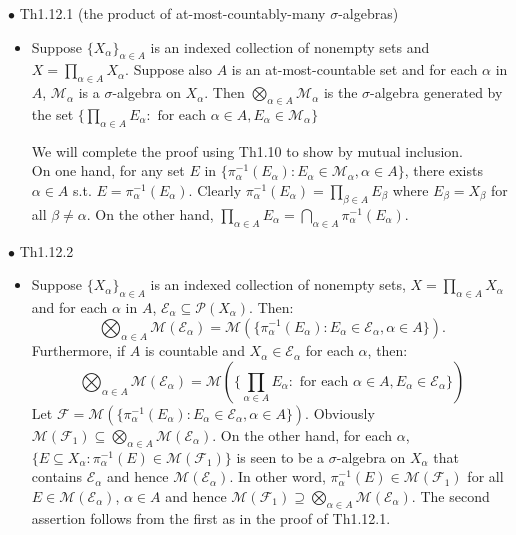 \documentclass{article}
\begin{document}
{\Large $\bullet $ Th1.12.1 (the product of at-most-countably-many $\sigma$-algebras)}\par
\begin{itemize}
    \item[]
    {\large Suppose $\{X_\alpha\}_{\alpha\in A}$ is an indexed collection of nonempty sets 
    and $X=\prod_{\alpha\in A}X_\alpha$. Suppose also $A$ is an at-most-countable set and for each $\alpha$ in $A$, 
    $\mathcal{M}_\alpha$ is a $\sigma$-algebra on $X_\alpha$. 
    Then $\bigotimes_{\alpha\in A}\mathcal{M}_\alpha$ is the $\sigma$-algebra 
    generated by the set 
    $\{\prod_{\alpha\in A}E_\alpha: \text{ for each } \alpha\in A, E_\alpha\in\mathcal{M}_\alpha\}$}\par
    {\textcolor{pf}{We will complete the proof using Th1.10 to show by mutual inclusion.\\
    On one hand, for any set $E$ in $\{\pi_{\alpha}^{-1}(E_\alpha):E_\alpha \in \mathcal{M}_\alpha, \alpha\in A\}$,
    there exists $\alpha\in A$ s.t. $E=\pi_{\alpha}^{-1}(E_\alpha)$. 
    Clearly $\pi_{\alpha}^{-1}(E_\alpha) = \prod_{\beta\in A}E_\beta$ 
    where $E_\beta = X_\beta$ for all $\beta\neq \alpha$. On the other hand, 
    $\prod_{\alpha\in A}E_\alpha = \bigcap_{\alpha\in A}\pi_{\alpha}^{-1}(E_\alpha)$.}}
\end{itemize}\par
\quad

{\Large $\bullet $ Th1.12.2}\par
\begin{itemize}
    \item[]
    {\large Suppose $\{X_\alpha\}_{\alpha\in A}$ is an indexed collection of nonempty sets,
    $X=\prod_{\alpha\in A}X_\alpha$ and for each $\alpha$ in $A$, 
    $\mathcal{E}_\alpha \subseteq\mathcal{P}(X_\alpha)$. Then:
    $$\bigotimes_{\alpha\in A}\mathcal{M}(\mathcal{E}_\alpha) = 
    \mathcal{M}(\{\pi_{\alpha}^{-1}(E_\alpha):E_\alpha \in \mathcal{E}_\alpha, \alpha\in A\}).$$
    Furthermore, if $A$ is countable and $X_\alpha\in \mathcal{E}_\alpha$ for each $\alpha$, then:
    $$\bigotimes_{\alpha\in A}\mathcal{M}(\mathcal{E}_\alpha) = \mathcal{M}(
    \{\prod_{\alpha\in A}E_\alpha: \text{ for each } \alpha\in A, E_\alpha\in\mathcal{E}_\alpha\})$$}
    {\textcolor{pf}{Let $\mathcal{F} = 
    \mathcal{M}(\{\pi_{\alpha}^{-1}(E_\alpha):E_\alpha \in \mathcal{E}_\alpha, \alpha\in A\})$.
    Obviously $\mathcal{M}(\mathcal{F}_1)\subseteq\bigotimes_{\alpha\in A}\mathcal{M}(\mathcal{E}_\alpha)$.
    On the other hand, for each $\alpha$, 
    $\{E\subseteq X_\alpha:\pi_\alpha^{-1}(E)\in \mathcal{M}(\mathcal{F}_1)\}$ is seen to be a $\sigma$-algebra
    on $X_\alpha$ that contains $\mathcal{E}_\alpha$ and hence $\mathcal{M}(\mathcal{E}_\alpha)$. In other word,
    $\pi_\alpha^{-1}(E)\in \mathcal{M}(\mathcal{F}_1)$ for all $E\in\mathcal{M}(\mathcal{E}_\alpha)$, $\alpha\in A$
    and hence $\mathcal{M}(\mathcal{F}_1)\supseteq\bigotimes_{\alpha\in A}\mathcal{M}(\mathcal{E}_\alpha)$. The second
    assertion follows from the first as in the proof of Th1.12.1.}}
\end{itemize}\par
\quad
\end{document}
